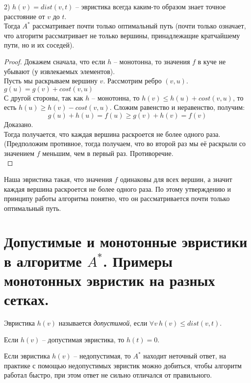 2) $h(v) = dist(v, t)$ -- эвристика всегда каким-то образом знает точное расстояние от $v$ до $t$.\\ Тогда $A^*$ рассматривает почти только оптимальный путь (почти только означает, что алгоритм рассматривает не только вершины, принадлежащие кратчайшему пути, но и их соседей).

\begin{proof}
    Докажем сначала, что если $h$ -- монотонна, то значения $f$ в куче не убывают (у извлекаемых элементов).\\
    Пусть мы раскрываем вершину $v$. Рассмотрим ребро $(v, u)$.\\
    $g(u) = g(v) + cost(v, u)$\\
    С другой стороны, так как $h$ -- монотонна, то $h(v) \leq h(u) + cost(v, u)$, то есть $h(u) \geq h(v) - cost(v, u)$.
    Сложим равенство и неравенство, получим:
    $$
        g(u) + h(u) = f(u) \geq g(v) + h(v) = f(v)
    $$
    Доказано.\\
    Тогда получается, что каждая вершина раскроется не более одного раза. (Предположим противное, тогда получаем, что во второй раз мы её раскрыли со значением $f$ меньшим, чем в первый раз. Противоречие.\\
\end{proof}

Наша эвристика такая, что значения $f$ одинаковы для всех вершин, а значит каждая вершина раскроется не более одного раза. По этому утверждению и принципу работы алгоритма понятно, что он рассматривается почти только оптимальный путь.





\setcounter{section}{51}
\section{Допустимые и монотонные эвристики в алгоритме $A^*$. Примеры монотонных эвристик на разных сетках.}

\begin{definition}
     Эвристика $h(v)$ называется \textit{допустимой}, если $\forall v \: h(v) \leq dist(v, t)$.
\end{definition}

\begin{corollary}
    Если $h(v)$ -- допустимая эвристика, то $h(t) = 0$.
\end{corollary}

\begin{note}[Дополнительно]
    Если эвристика $h(v)$ -- недопустимая, то $A^*$ находит неточный ответ, на практике с помощью недопустимых эвристик можно добиться, чтобы алгоритм работал быстро, при этом ответ не сильно отличался от правильного.
\end{note}

